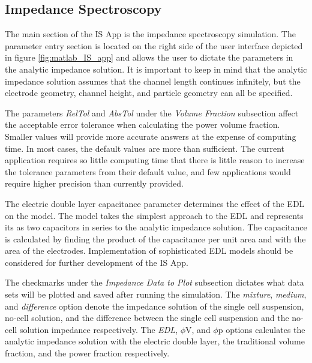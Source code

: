 \subsection*{Impedance Spectroscopy}

\par The main section of the IS App is the impedance spectroscopy simulation. The parameter entry section is located on the right side of the user interface depicted in figure \ref{fig:matlab_IS_app} and allows the user to dictate the parameters in the analytic impedance solution. It is important to keep in mind that the analytic impedance solution assumes that the channel length continues infinitely, but the electrode geometry, channel height, and particle geometry can all be specified. 

\par The parameters \textit{RelTol} and \textit{AbsTol} under the \textit{Volume Fraction} subsection affect the acceptable error tolerance when calculating the power volume fraction. Smaller values will provide more accurate answers at the expense of computing time. In most cases, the default values are more than sufficient. The current application requires so little computing time that there is little reason to increase the tolerance parameters from their default value, and few applications would require higher precision than currently provided.

\par The electric double layer capacitance parameter determines the effect of the EDL on the model. The model takes the simplest approach to the EDL and represents its as two capacitors in series to the analytic impedance solution. The capacitance is calculated by finding the product of the capacitance per unit area and with the area of the electrodes. Implementation of sophisticated EDL models should be considered for further development of the IS App. 

\par The checkmarks under the \textit{Impedance Data to Plot} subsection dictates what data sets will be plotted and saved after running the simulation. The \textit{mixture}, \textit{medium}, and \textit{difference} option denote the impedance solution of the single cell suspension, no-cell solution, and the difference between the single cell suspension and the no-cell solution impedance respectively. The \textit{EDL}, $\phi$V, and $\phi$p options calculates the analytic impedance solution with the electric double layer, the traditional volume fraction, and the power fraction respectively.

